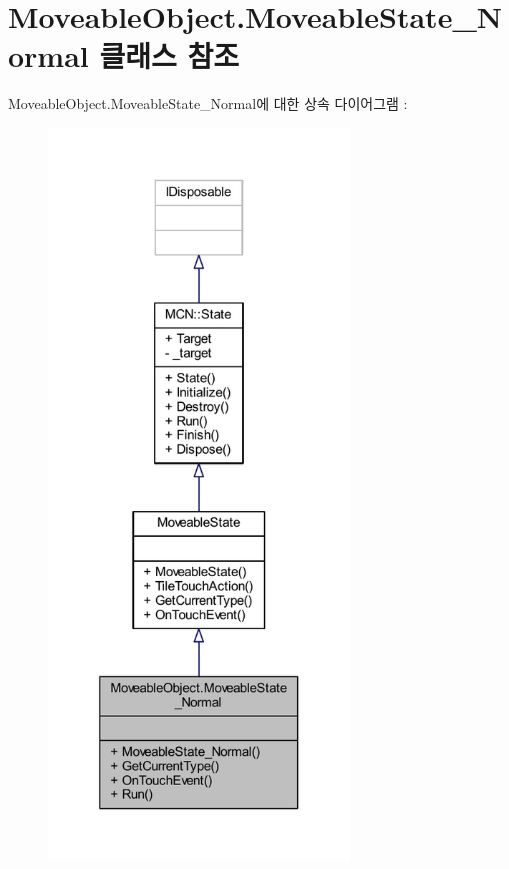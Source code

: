 \hypertarget{class_moveable_object_1_1_moveable_state___normal}{}\section{Moveable\+Object.\+Moveable\+State\+\_\+\+Normal 클래스 참조}
\label{class_moveable_object_1_1_moveable_state___normal}


Moveable\+Object.\+Moveable\+State\+\_\+\+Normal에 대한 상속 다이어그램 \+: \nopagebreak
\begin{figure}[H]
\begin{center}
\leavevmode
\includegraphics[height=550pt]{class_moveable_object_1_1_moveable_state___normal__inherit__graph}
\end{center}
\end{figure}


